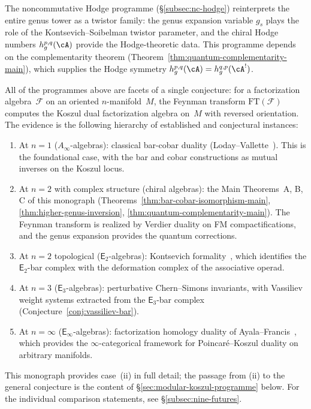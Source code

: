 The noncommutative Hodge programme (\S\ref{subsec:nc-hodge})
reinterprets the entire genus tower as a twistor family: the
genus expansion variable $g_s$ plays the role of the
Kontsevich--Soibelman twistor parameter, and the chiral Hodge
numbers $h^{p,q}_g(\cA)$ provide the Hodge-theoretic data.
This programme depends on the complementarity theorem
(Theorem~\ref{thm:quantum-complementarity-main}), which supplies
the Hodge symmetry $h^{p,q}_g(\cA) = h^{q,p}_g(\cA^!)$.

\begin{remark}\label{rem:unifying-vision}
All of the programmes above are facets of a single conjecture:
for a factorization algebra~$\mathcal{F}$ on an oriented
$n$-manifold~$M$, the Feynman transform
$\mathrm{FT}(\mathcal{F})$ computes the Koszul dual
factorization algebra on~$M$ with reversed orientation.
The evidence is the following hierarchy of established and
conjectural instances:
\begin{enumerate}[label=\textup{(\roman*)}]
\item At $n = 1$ \textup{(}$A_\infty$-algebras\textup{)}:
  classical bar-cobar duality
  \textup{(}Loday--Vallette~\cite{LV12}\textup{)}.  This is the
  foundational case, with the bar and cobar constructions as mutual
  inverses on the Koszul locus.
\item At $n = 2$ with complex structure
  \textup{(}chiral algebras\textup{)}: the Main Theorems~A, B, C
  of this monograph
  \textup{(}Theorems~\ref{thm:bar-cobar-isomorphism-main},
  \ref{thm:higher-genus-inversion},
  \ref{thm:quantum-complementarity-main}\textup{)}.  The Feynman
  transform is realized by Verdier duality on FM compactifications,
  and the genus expansion provides the quantum corrections.
\item At $n = 2$ topological
  \textup{(}$\mathsf{E}_2$-algebras\textup{)}: Kontsevich
  formality~\cite{Kon03}, which identifies the $\mathsf{E}_2$-bar
  complex with the deformation complex of the associative operad.
\item At $n = 3$
  \textup{(}$\mathsf{E}_3$-algebras\textup{)}:
  perturbative Chern--Simons invariants, with Vassiliev weight
  systems extracted from the $\mathsf{E}_3$-bar complex
  \textup{(}Conjecture~\ref{conj:vassiliev-bar}\textup{)}.
\item At $n = \infty$
  \textup{(}$\mathsf{E}_\infty$-algebras\textup{)}:
  factorization homology duality of
  Ayala--Francis~\cite{AF15}, which provides the
  $\infty$-categorical framework for Poincar\'e--Koszul
  duality on arbitrary manifolds.
\end{enumerate}
This monograph provides case~(ii) in full detail; the passage
from (ii) to the general conjecture is the content of
\S\ref{sec:modular-koszul-programme} below.  For the individual comparison statements, see
\S\ref{subsec:nine-futures}.
\end{remark}


